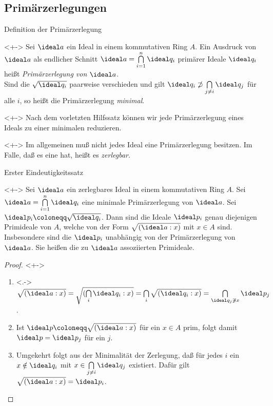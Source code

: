 \subsection{Primärzerlegungen}

\begin{frame}{Definition der Primärzerlegung}
	\begin{definition}<+->
		Sei \(\ideal a\) ein Ideal in einem kommutativen Ring \(A\). Ein Ausdruck von \(\ideal a\) als endlicher Schnitt
		\(\ideal a = \bigcap\limits_{i = 1}^n \ideal q_i\) primärer Ideale \(\ideal q_i\) heißt \emph{Primärzerlegung von \(\ideal a\)}.
		\\
		Sind die \(\sqrt{\ideal q_i}\) paarweise verschieden und gilt \(\ideal q_i \not\supset \bigcap\limits_{j \neq i}
		\ideal q_j\) für alle \(i\), so heißt die Primärzerlegung \emph{minimal}.
	\end{definition}
	\begin{remark}<+->
		Nach dem vorletzten Hilfssatz können wir jede Primärzerlegung eines Ideals zu einer minimalen reduzieren.
	\end{remark}
	\begin{remark}<+->
		Im allgemeinen muß nicht jedes Ideal eine Primärzerlegung besitzen. Im Falle, daß es eine hat, heißt es \emph{zerlegbar}.
	\end{remark}
\end{frame}

\begin{frame}{Erster Eindeutigkeitssatz}
	\begin{theorem}<+->
		\label{thm:first_uniqueness}
		Sei \(\ideal a\) ein zerlegbares Ideal in einem kommutativen Ring \(A\). Sei \(\ideal a = \bigcap\limits_{i = 1}^n \ideal
		q_i\) eine minimale Primärzerlegung von \(\ideal a\). Sei \(\ideal p_i \coloneqq \sqrt{\ideal q_i}\). Dann sind die Ideale
		\(\ideal p_i\) genau diejenigen Primideale von \(A\), welche von der Form \(\sqrt{(\ideal a : x)}\) mit \(x \in A\) sind.
		\\
		Insbesondere sind die \(\ideal p_i\) unabhängig von der Primärzerlegung von \(\ideal a\). Sie heißen die 			\alert{zu \(\ideal a\)
		assoziierten Primideale}.
	\end{theorem}
	\begin{proof}<+->
		\begin{enumerate}[<+->]
		\item<.->
			\(\sqrt{(\ideal a : x)} = \sqrt{(\bigcap\limits_i \ideal q_i : x)} = \bigcap\limits_i
			\sqrt{(\ideal q_i : x)} = \bigcap\limits_{\ideal q_j \not\ni x} \ideal p_j\).
		\item
			Ist \(\ideal p \coloneqq \sqrt{(\ideal a : x)}\) für ein \(x \in A\) prim, folgt damit \(\ideal p = \ideal p_j\) für ein
			\(j\).
		\item
			Umgekehrt folgt aus der Minimalität der Zerlegung, daß für jedes \(i\) ein \(x \notin \ideal q_i\) mit
			\(x \in \bigcap\limits_{j \neq i} \ideal q_j\) existiert. Dafür gilt \(\sqrt{(\ideal a : x)} = \ideal p_i\).
			\qedhere
		\end{enumerate}
	\end{proof}
\end{frame}

